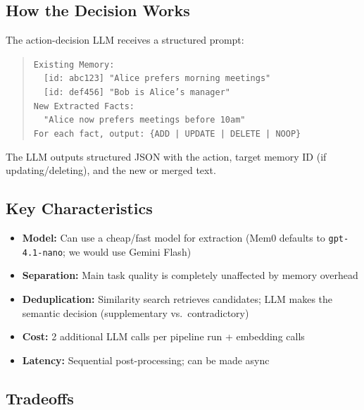 \documentclass[11pt, letterpaper]{article}
\begin{document}
\subsection{How the Decision Works}

The action-decision LLM receives a structured prompt:

\begin{quote}
\small
\texttt{Existing Memory:}\\
\texttt{~~[id: abc123] "Alice prefers morning meetings"}\\
\texttt{~~[id: def456] "Bob is Alice's manager"}\\[0.5em]
\texttt{New Extracted Facts:}\\
\texttt{~~"Alice now prefers meetings before 10am"}\\[0.5em]
\texttt{For each fact, output: \{ADD | UPDATE | DELETE | NOOP\}}
\end{quote}

\noindent The LLM outputs structured JSON with the action, target memory ID (if updating/deleting),
and the new or merged text.

\subsection{Key Characteristics}

\begin{itemize}[leftmargin=2em]
    \item \textbf{Model:} Can use a cheap/fast model for extraction (Mem0 defaults to
          \texttt{gpt-4.1-nano}; we would use Gemini Flash)
    \item \textbf{Separation:} Main task quality is completely unaffected by memory overhead
    \item \textbf{Deduplication:} Similarity search retrieves candidates; LLM makes the
          semantic decision (supplementary vs.\ contradictory)
    \item \textbf{Cost:} 2 additional LLM calls per pipeline run + embedding calls
    \item \textbf{Latency:} Sequential post-processing; can be made async
\end{itemize}

\subsection{Tradeoffs}
\end{document}
